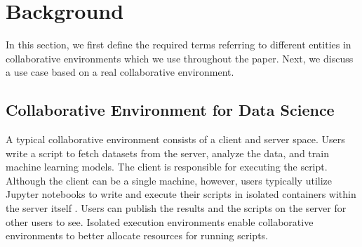 \section{Background} \label{sec-background}
In this section, we first define the required terms referring to different entities in collaborative environments which we use throughout the paper.
Next, we discuss a use case based on a real collaborative environment.

\subsection{Collaborative Environment for Data Science}
A typical collaborative environment consists of a client and server space.
Users write a script to fetch datasets from the server, analyze the data, and train machine learning models.
The client is responsible for executing the script.
Although the client can be a single machine, however, users typically utilize Jupyter notebooks  \cite{Kluyver:2016aa} to write and execute their scripts in isolated containers \cite{merkel2014docker} within the server itself \cite{kagglewebsite, googlecolab, netflix-notebook}.
Users can publish the results and the scripts on the server for other users to see.
Isolated execution environments enable collaborative environments to better allocate resources for running scripts.

